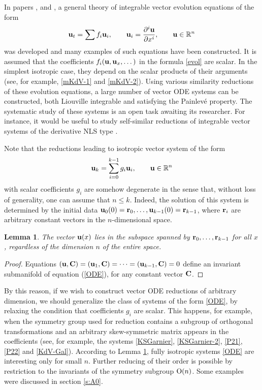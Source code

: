 \documentclass[11pt]{article}
\theoremstyle{plain}
\newtheorem{lemma}[proposition]{Lemma}
\theoremstyle{definition}
\begin{document}
In papers \cite{Sokolov-Wolf}, \cite{Meshkov-Sokolov} and \cite{Balakhnev-Meshkov}, a general theory of integrable vector evolution equations of the form 
\begin{equation}\label{evol}
{\bf u}_t = \sum f_i {\bf u}_i, \qquad {\bf u}_i = \frac{\partial^i {\bf u}}{\partial x^i}, \qquad   {\bf u}\in{\mathbb R}^n
\end{equation}
was developed and many examples of such equations have been constructed. It is assumed that the coefficients $f_i({\bf u}, {\bf u}_x, \dots)$ in the formula \eqref{evol} are scalar. In the simplest isotropic case, they depend on the scalar products of their arguments (see, for example, \eqref{mKdV-1} and \eqref{mKdV-2}). Using various similarity reductions of these evolution equations, a large number of vector ODE systems can be constructed, both Liouville integrable and satisfying the Painlev\'e property. The systematic study of these systems is an open task awaiting its researcher. For instance, it would be useful to study self-similar reductions of integrable vector systems of the derivative NLS type \cite{Sokolov-Wolf}.

Note that the reductions leading to isotropic vector system of the form
\begin{equation}\label{ODE}
{\bf u}_k = \sum_{i=0}^{k-1} g_i {\bf u}_i , \qquad {\bf u}\in{\mathbb R}^n
\end{equation}
with scalar coefficients $g_i$ are somehow degenerate in the sense that, without loss of generality, one can assume that $n\le k$. Indeed, the solution of this system is determined by the initial data ${\bf u}_0(0)={\bf r}_0,\dots,{\bf u}_{k-1}(0)={\bf r}_{k-1}$, where ${\bf r}_i$ are arbitrary constant vectors in the $n$-dimensional space.

\begin{lemma}\label{lem} 
The vector ${\bf u}(x)$ lies in the subspace spanned by ${\bf r}_0,\dots,{\bf r}_{k-1}$ for all $x$, regardless of the dimension $n$ of the entire space.
\end{lemma}
\begin{proof} 
Equations $({\bf u},{\bf C})=({\bf u}_1,{\bf C})=\dots=({\bf u}_{k-1},{\bf C})=0$ define an invariant submanifold of equation (\ref{ODE}), for any constant vector ${\bf C}$.
\end{proof}

By this reason, if we wish to construct vector ODE reductions of arbitrary dimension, we should generalize the class of systems of the form \eqref{ODE}, by relaxing the condition that coefficients $g_i$ are scalar. This happens, for example, when the symmetry group used for reduction contains a subgroup of orthogonal transformations and an arbitrary skew-symmetric matrix appears in the coefficients (see, for example, the systems \eqref{KSGarnier}, \eqref{KSGarnier-2}, \eqref{P21}, \eqref{P22} and \eqref{KdV-Gal}). According to Lemma \ref{lem}, fully isotropic systems  \eqref{ODE} are interesting only for small $n$. Further reducing of their order is possible by restriction to the invariants of the symmetry subgroup ${\rm O}(n)$. Some examples were discussed in section \ref{s:A0}.
\end{document}
